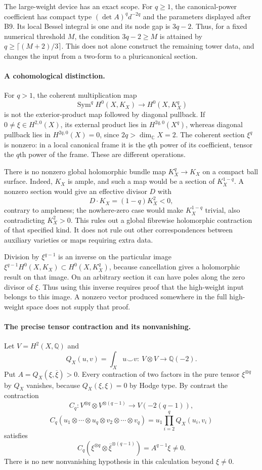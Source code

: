 \documentclass[11pt]{article}
\newcommand{\Q}{\mathbb Q}\newcommand{\C}{\mathbb C}\newcommand{\Z}{\mathbb Z}\newcommand{\R}{\mathbb R}\newcommand{\A}{\mathbb A}\newcommand{\OO}{\mathcal O}
\theoremstyle{definition}\newtheorem{definition}[theorem]{Definition}\newtheorem{remark}[theorem]{Remark}
\begin{document}
The large-weight device has an exact scope. For $q\geq1$, the canonical-power coefficient has compact type $(\det A)^qd^{-2q}$ and the parameters displayed after B9. Its local Bessel integral is one and its node gap is $3q-2$. Thus, for a fixed numerical threshold $M$, the condition $3q-2\geq M$ is attained by $q\geq\lceil(M+2)/3\rceil$. This does not alone construct the remaining tower data, and changes the input from a two-form to a pluricanonical section.

\paragraph{A cohomological distinction.}
For $q>1$, the coherent multiplication map
\[
 \operatorname{Sym}^q H^0(X,K_X)\longrightarrow H^0(X,K_X^q)
\]
is not the exterior-product map followed by diagonal pullback. If
$0\ne\xi\in H^{2,0}(X)$, its external product lies in
$H^{2q,0}(X^q)$, whereas diagonal pullback lies in
$H^{2q,0}(X)=0$, since $2q>\dim_\C X=2$.
The coherent section $\xi^q$ is nonzero: in a local canonical frame it is the $q$th power of its coefficient, tensor the $q$th power of the frame. These are different operations.

There is no nonzero global holomorphic bundle map $K_X^q\to K_X$ on a compact ball surface. Indeed, $K_X$ is ample, and such a map would be a section of $K_X^{1-q}$. A nonzero section would give an effective divisor $D$ with
\[
 D\cdot K_X=(1-q)K_X^2<0,
\]
contrary to ampleness; the nowhere-zero case would make $K_X^{1-q}$ trivial, also contradicting $K_X^2>0$. This rules out a global fibrewise holomorphic contraction of that specified kind. It does not rule out other correspondences between auxiliary varieties or maps requiring extra data.

Division by $\xi^{q-1}$ is an inverse on the particular image
$\xi^{q-1}H^0(X,K_X)\subset H^0(X,K_X^q)$, because cancellation gives a holomorphic result on that image. On an arbitrary section it can have poles along the zero divisor of $\xi$. Thus using this inverse requires proof that the high-weight input belongs to this image. A nonzero vector produced somewhere in the full high-weight space does not supply that proof.

\paragraph{The precise tensor contraction and its nonvanishing.}
Let $V=H^2(X,\Q)$ and
\[
 Q_X(u,v)=\int_Xu\smile v:\ V\otimes V\longrightarrow\Q(-2).
\]
Put $A=Q_X(\xi,\overline\xi)>0$. Every contraction of two factors in the pure tensor $\xi^{\otimes q}$ by $Q_X$ vanishes, because $Q_X(\xi,\xi)=0$ by Hodge type. By contrast the contraction
\[
 C_q:V^{\otimes q}\otimes V^{\otimes(q-1)}
       \longrightarrow V(-2(q-1)),
\]
\[
 C_q(u_1\otimes\cdots\otimes u_q\otimes v_2\otimes\cdots\otimes v_q)
       =u_1\prod_{i=2}^q Q_X(u_i,v_i)
\]
satisfies
\[
 C_q(\xi^{\otimes q}\otimes\overline\xi^{\otimes(q-1)})
           =A^{q-1}\xi\ne0.
 \tag{B14a}
\]
There is no new nonvanishing hypothesis in this calculation beyond $\xi\ne0$.
\end{document}
